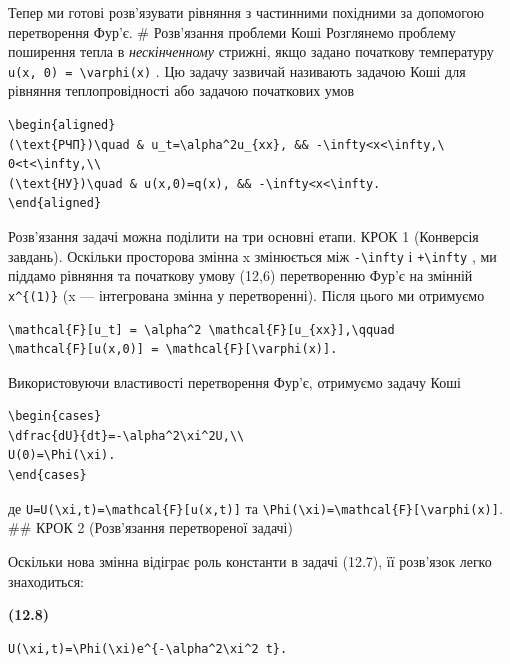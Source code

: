 \documentclass[
  ukrainian,
]{article}
\begin{document}
Тепер ми готові розв'язувати рівняння з частинними похідними за
допомогою перетворення Фур'є. \# Розв'язання проблеми Коші Розглянемо
проблему поширення тепла в \emph{нескінченному} стрижні, якщо задано
початкову температуру \texttt{u(x,\ 0)\ =\ \textbackslash{}varphi(x)} .
Цю задачу зазвичай називають задачою Коші для рівняння теплопровідності
або задачою початкових умов

\begin{verbatim}
\begin{aligned}
(\text{РЧП})\quad & u_t=\alpha^2u_{xx}, && -\infty<x<\infty,\ 0<t<\infty,\\
(\text{НУ})\quad & u(x,0)=q(x), && -\infty<x<\infty.
\end{aligned}
\end{verbatim}

Розв'язання задачі можна поділити на три основні етапи. КРОК 1
(Конверсія завдань). Оскільки просторова змінна x змінюється між
\texttt{-\textbackslash{}infty} і \texttt{+\textbackslash{}infty} , ми
піддамо рівняння та початкову умову (12,6) перетворенню Фур'є на змінній
\texttt{x\^{}\{(1)\}} (x --- інтегрована змінна у перетворенні). Після
цього ми отримуємо

\begin{verbatim}
\mathcal{F}[u_t] = \alpha^2 \mathcal{F}[u_{xx}],\qquad
\mathcal{F}[u(x,0)] = \mathcal{F}[\varphi(x)].
\end{verbatim}

Використовуючи властивості перетворення Фур'є, отримуємо задачу Коші

\begin{verbatim}
\begin{cases}
\dfrac{dU}{dt}=-\alpha^2\xi^2U,\\
U(0)=\Phi(\xi).
\end{cases}
\end{verbatim}

де
\texttt{U=U(\textbackslash{}xi,t)=\textbackslash{}mathcal\{F\}{[}u(x,t){]}}
та
\texttt{\textbackslash{}Phi(\textbackslash{}xi)=\textbackslash{}mathcal\{F\}{[}\textbackslash{}varphi(x){]}}.
\#\# КРОК 2 (Розв'язання перетвореної задачі)

Оскільки нова змінна відіграє роль константи в задачі (12.7), її
розв'язок легко знаходиться:

\textbf{(12.8)}

\begin{verbatim}
U(\xi,t)=\Phi(\xi)e^{-\alpha^2\xi^2 t}.
\end{verbatim}
\end{document}
